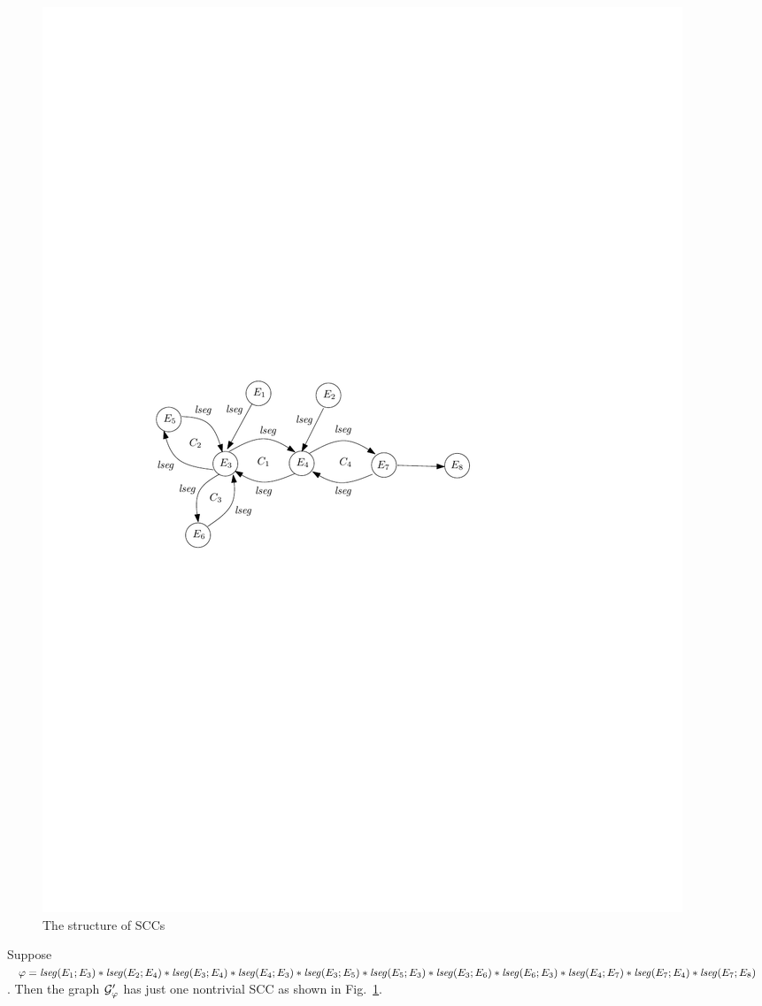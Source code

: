 \documentclass{llncs}
\begin{document}
\begin{figure}[h]
\begin{center}
\includegraphics[scale=0.61]{scc-example.pdf}
\end{center}
\vspace{-6mm}
\caption{The structure of SCCs}
\label{fig-scc}
\vspace{-6mm}
\end{figure}

\begin{example}\label{exmp-scc}
Suppose $\varphi = \mathit{lseg}(E_1; E_3) \ast \mathit{lseg}(E_2; E_4) \ast \mathit{lseg}(E_3; E_4) \ast \mathit{lseg}(E_4; E_3) \ast \mathit{lseg}(E_3; E_5) \ast \mathit{lseg}(E_5; E_3) \ast \mathit{lseg}(E_3; E_6) \ast \mathit{lseg}(E_6;  E_3) \ast \mathit{lseg}(E_4; E_7) \ast \mathit{lseg}(E_7; E_4) \ast \mathit{lseg}(E_7; E_8)$. Then the graph $\mathcal{G}'_\varphi$ has just one nontrivial SCC as shown in Fig.~\ref{fig-scc}.
\end{example}
\end{document}
